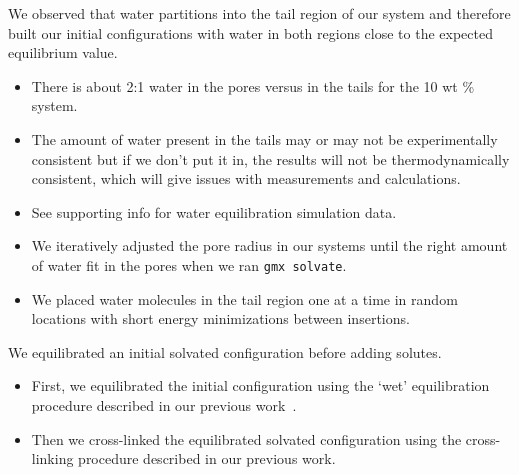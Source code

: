 \documentclass{article}
\begin{document}
  We observed that water partitions into the tail region of our system and therefore
  built our initial configurations with water in both regions close to the expected
  equilibrium value.
  \begin{itemize}
	\item There is about 2:1 water in the pores versus in the tails for the 10 wt \% system.
	\item The amount of water present in the tails may or may not be experimentally consistent
	but if we don't put it in, the results will not be thermodynamically consistent, which 
	will give issues with measurements and calculations.
	\item See supporting info for water equilibration simulation data.
	\item We iteratively adjusted the pore radius in our systems until the right amount of water
	fit in the pores when we ran \texttt{gmx solvate}.
	\item We placed water molecules in the tail region one at a time in random locations
	with short energy minimizations between insertions.
  \end{itemize}



  \noindent We equilibrated an initial solvated configuration before adding solutes.
  \begin{itemize}
	\item First, we equilibrated the initial configuration using the `wet'
	equilibration procedure described in our previous work~\cite{coscia_understanding_2019}.
	\item Then we cross-linked the equilibrated solvated configuration using the
	cross-linking procedure described in our previous work. 
  \end{itemize}
\end{document}
